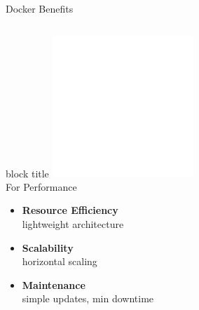 \documentclass[notes]{beamer}
\begin{document}
{\begin{frame}{Docker Benefits}
\begin{columns}[T]
    \begin{column}{0.32\textwidth}
\begin{beamercolorbox}[shadow=true,rounded=true]{block title}
        \centering 
        \includegraphics[width=0.4\textwidth]{performance.png}\\[0.3em]
        For Performance
      \end{beamercolorbox}
      \begin{itemize}
        \item \textbf{Resource Efficiency} \\[-0.4em]
        {\tiny lightweight architecture}
        \item \textbf{Scalability} \\[-0.4em]
        {\tiny horizontal scaling}
        \item \textbf{Maintenance} \\[-0.4em]
        {\tiny simple updates, min downtime}
      \end{itemize}
    \end{column}
    
    \hspace{0.2em}
    

\end{columns}
\end{frame}}
\end{document}
